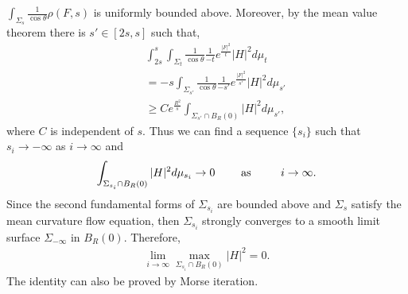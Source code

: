 $\int_{\Sigma_s}\frac{1}{\cos\theta}\rho(F, s)$ is uniformly
bounded above. Moreover, by the mean value theorem there is
$s'\in [2s, s]$ such that,
\begin{eqnarray*}
&&\int^{s}_{2s}\int_{\Sigma_t}\frac{1}{\cos\theta}\frac{1}{-t}
e^{\frac{|F|^2}{t}}|H|^2 d\mu_t\\
&&=-s\int_{\Sigma_{s'}}\frac{1}{\cos\theta}\frac{1}{-s'}
e^{\frac{|F|^2}{s'}}|H|^2 d\mu_{s'}\\
&&\geq C e^{\frac{R^2}{s}}\int_{\Sigma_{s'}\cap B_R(0)} |H|^2
d\mu_{s'},
\end{eqnarray*}  where $C$ is independent of $s$. Thus we can find
a sequence $\{s_i\}$ such that $s_i\to-\infty$ as $i\to\infty$ and
$$\int_{\Sigma_{s_i}\cap B_R(0)} |H|^2 d\mu_{s_i}\to 0~~~~~~~{\rm
as}~~~~~~~~ i\to\infty.
$$ Since the second fundamental forms of $\Sigma_{s_i}$ are bounded above and
$\Sigma_{s}$ satisfy the mean curvature flow equation, then
$\Sigma_{s_i}$ strongly converges to a smooth limit surface
$\Sigma_{-\infty}$ in $B_R(0)$. Therefore,
\begin{eqnarray}\label{e7}\lim_{i\to \infty}\max_{\Sigma_{s_i}\cap B_R(0)}|H|^2=0.
\end{eqnarray} The identity can also be proved by Morse iteration.

